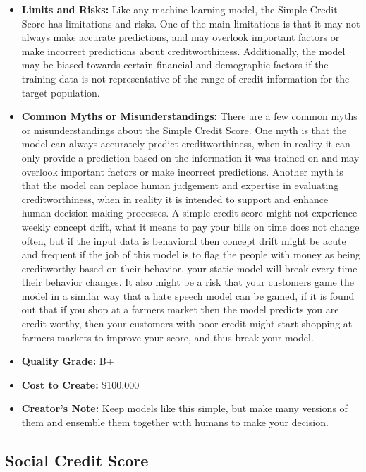 \begin{itemize}
    \item \textbf{Limits and Risks:} Like any machine learning model, the Simple Credit Score has limitations and risks. One of the main limitations is that it may not always make accurate predictions, and may overlook important factors or make incorrect predictions about creditworthiness. Additionally, the model may be biased towards certain financial and demographic factors if the training data is not representative of the range of credit information for the target population.
    \item \textbf{Common Myths or Misunderstandings:} There are a few common myths or misunderstandings about the Simple Credit Score. One myth is that the model can always accurately predict creditworthiness, when in reality it can only provide a prediction based on the information it was trained on and may overlook important factors or make incorrect predictions. Another myth is that the model can replace human judgement and expertise in evaluating creditworthiness, when in reality it is intended to support and enhance human decision-making processes. A simple credit score might not experience weekly concept drift, what it means to pay your bills on time does not change often, but if the input data is behavioral then \hyperref[sec:drift]{concept drift} might be acute and frequent if the job of this model is to flag the people with money as being creditworthy based on their behavior, your static model will break every time their behavior changes. It also might be a risk that your customers game the model in a similar way that a hate speech model can be gamed, if it is found out that if you shop at a farmers market then the model predicts you are credit-worthy, then your customers with poor credit might start shopping at farmers markets to improve your score, and thus break your model.
    \item \textbf{Quality Grade:} B+
    \item \textbf{Cost to Create:} \$100,000
    \item \textbf{Creator's Note:} Keep models like this simple, but make many versions of them and ensemble them together with humans to make your decision. 
\end{itemize}

\subsection{Social Credit Score}

